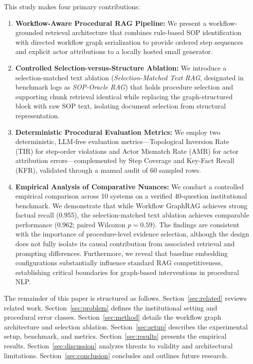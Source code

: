\documentclass[preprint,10pt]{elsarticle}
\begin{document}
This study makes four primary contributions:
\begin{enumerate}[leftmargin=*]
\item \textbf{Workflow-Aware Procedural RAG Pipeline:} We present a workflow-grounded retrieval architecture that combines rule-based SOP identification with directed workflow graph serialization to provide ordered step sequences and explicit actor attributions to a locally hosted small generator.
\item \textbf{Controlled Selection-versus-Structure Ablation:} We introduce a selection-matched text ablation (\emph{Selection-Matched Text RAG}, designated in benchmark logs as \emph{SOP-Oracle RAG}) that holds procedure selection and supporting chunk retrieval identical while replacing the graph-structured block with raw SOP text, isolating document selection from structural representation.
\item \textbf{Deterministic Procedural Evaluation Metrics:} We employ two deterministic, LLM-free evaluation metrics---Topological Inversion Rate (TIR) for step-order violations and Actor Mismatch Rate (AMR) for actor attribution errors---complemented by Step Coverage and Key-Fact Recall (KFR), validated through a manual audit of 60 sampled rows.
\item \textbf{Empirical Analysis of Comparative Nuances:} We conduct a controlled empirical comparison across 10 systems on a verified 40-question institutional benchmark. We demonstrate that while Workflow GraphRAG achieves strong factual recall (0.955), the selection-matched text ablation achieves comparable performance (0.962; paired Wilcoxon $p=0.59$). The findings are consistent with the importance of procedure-level evidence selection, although the design does not fully isolate its causal contribution from associated retrieval and prompting differences. Furthermore, we reveal that baseline embedding configurations substantially influence standard RAG competitiveness, establishing critical boundaries for graph-based interventions in procedural NLP.
\end{enumerate}

The remainder of this paper is structured as follows. Section~\ref{sec:related} reviews related work. Section~\ref{sec:problem} defines the institutional setting and procedural error classes. Section~\ref{sec:method} details the workflow graph architecture and selection ablation. Section~\ref{sec:setup} describes the experimental setup, benchmark, and metrics. Section~\ref{sec:results} presents the empirical results. Section~\ref{sec:discussion} analyzes threats to validity and architectural limitations. Section~\ref{sec:conclusion} concludes and outlines future research.
\end{document}
